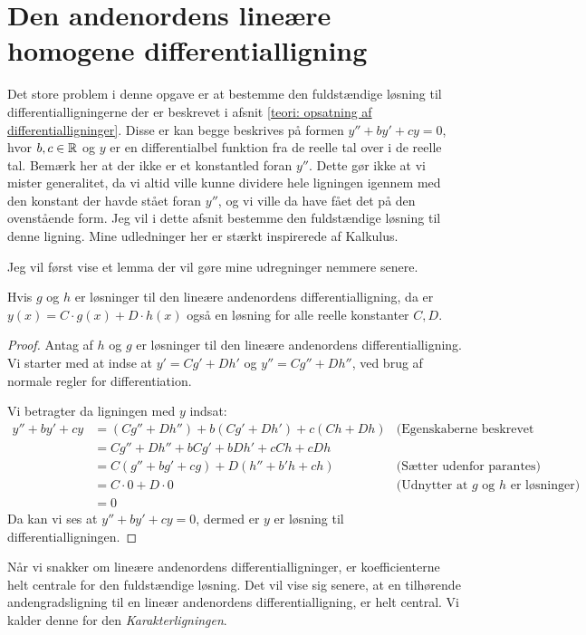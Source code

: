 \section{Den andenordens lineære homogene differentialligning}
Det store problem i denne opgave er at bestemme den fuldstændige løsning til differentialligningerne der er beskrevet i afsnit \ref{teori: opsatning af differentialligninger}.
Disse er kan begge beskrives på formen $y'' + by' + cy = 0$, hvor $b,c \in \mathbb{R}$ og $y$ er en differentialbel funktion fra de reelle tal over i de reelle tal. 
Bemærk her at der ikke er et konstantled foran $y''$. 
Dette gør ikke at vi mister generalitet, da vi altid ville kunne dividere hele ligningen igennem med den konstant der havde stået foran $y''$, og vi ville da have fået det på den ovenstående form. 
Jeg vil i dette afsnit bestemme den fuldstændige løsning til denne ligning. 
Mine udledninger her er stærkt inspirerede af Kalkulus. 

Jeg vil først vise et lemma der vil gøre mine udregninger nemmere senere.

\begin{lemma}
Hvis $g$ og $h$ er løsninger til den lineære andenordens differentialligning, da er $y(x) = C\cdot g(x) + D \cdot h(x)$ også en løsning for alle reelle konstanter $C,D$. 
\end{lemma}

\begin{proof}
Antag af $h$ og $g$ er løsninger til den lineære andenordens differentialligning. 
Vi starter med at indse at $y'=Cg' + Dh'$ og $y'' = Cg'' + Dh''$, ved brug af normale regler for differentiation. 

Vi betragter da ligningen med $y$ indsat:
\begin{align*}
y'' + by' + cy 	&= (Cg'' + Dh'') + b(Cg' + Dh') + c(Ch + Dh)	& \text{(Egenskaberne beskrevet ovenfor)}\\
				&= Cg'' + Dh'' + bCg' + bDh' + cCh + cDh		\\
				&= C(g'' + bg' + cg) + D(h'' + b'h + ch)		& \text{(Sætter udenfor parantes)}\\
				&= C\cdot 0 + D \cdot 0							& \text{(Udnytter at $g$ og $h$ er løsninger)}\\
				&= 0 
\end{align*}
Da kan vi ses at $y'' + by' + cy = 0$, dermed er $y$ er løsning til differentialligningen.
\end{proof}

Når vi snakker om lineære andenordens differentialligninger, er koefficienterne helt centrale for den fuldstændige løsning. 
Det vil vise sig senere, at en tilhørende andengradsligning til en lineær andenordens differentialligning, er helt central. Vi kalder denne for den \textit{Karakterligningen}.

